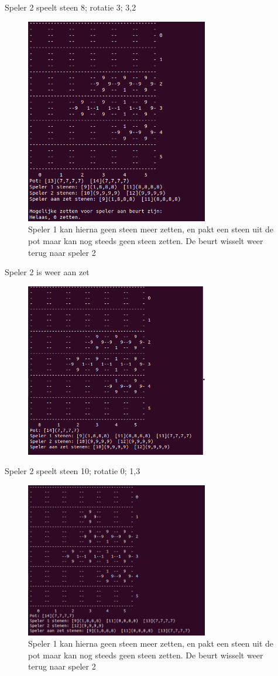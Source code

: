 \documentclass{article}
\begin{document}
Speler 2 speelt steen 8; rotatie 3; 3,2\\
\begin{figure}[htp]
    \centering
    \includegraphics[width=8cm]{algo1/imgs/three.png}
    \caption{Speler 1 kan hierna geen steen meer zetten, en pakt een steen uit de pot maar kan nog steeds geen steen zetten. De beurt wisselt weer terug naar speler 2}
    \label{fig:galaxy}
\end{figure}
\newpage
Speler 2 is weer aan zet\\
\begin{figure}[htp]
    \centering
    \includegraphics[width=8cm]{algo1/imgs/four.png}
    \label{fig:galaxy}
\end{figure}
\newpage
Speler 2 speelt steen 10; rotatie 0; 1,3
\begin{figure}[htp]
    \centering
    \includegraphics[width=8cm]{algo1/imgs/five.png}
    \caption{Speler 1 kan hierna geen steen meer zetten, en pakt een steen uit de pot maar kan nog steeds geen steen zetten. De beurt wisselt weer terug naar speler 2}
    \label{fig:galaxy}
\end{figure}
\end{document}
